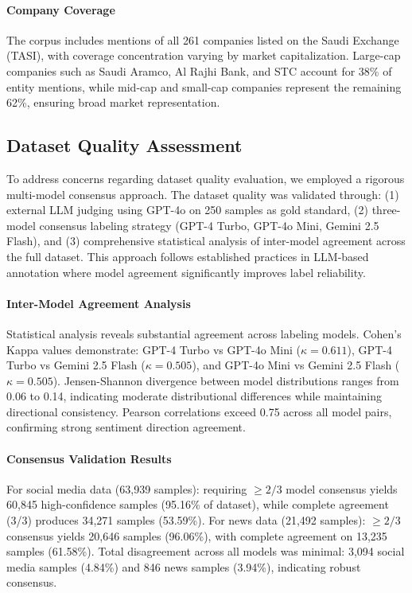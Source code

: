 \documentclass[10pt,a4paper]{article}
\begin{document}
\paragraph{Company Coverage}
The corpus includes mentions of all 261 companies listed on the Saudi Exchange (TASI), with coverage concentration varying by market capitalization. Large-cap companies such as Saudi Aramco, Al Rajhi Bank, and STC account for 38\% of entity mentions, while mid-cap and small-cap companies represent the remaining 62\%, ensuring broad market representation.

\subsection{Dataset Quality Assessment}
\label{sec:dataset_quality}

To address concerns regarding dataset quality evaluation, we employed a rigorous multi-model consensus approach. The dataset quality was validated through: (1) external LLM judging using GPT-4o on 250 samples as gold standard, (2) three-model consensus labeling strategy (GPT-4 Turbo, GPT-4o Mini, Gemini 2.5 Flash), and (3) comprehensive statistical analysis of inter-model agreement across the full dataset. This approach follows established practices in LLM-based annotation where model agreement significantly improves label reliability.

\paragraph{Inter-Model Agreement Analysis}
Statistical analysis reveals substantial agreement across labeling models. Cohen's Kappa values demonstrate: GPT-4 Turbo vs GPT-4o Mini ($\kappa = 0.611$), GPT-4 Turbo vs Gemini 2.5 Flash ($\kappa = 0.505$), and GPT-4o Mini vs Gemini 2.5 Flash ($\kappa = 0.505$). Jensen-Shannon divergence between model distributions ranges from 0.06 to 0.14, indicating moderate distributional differences while maintaining directional consistency. Pearson correlations exceed 0.75 across all model pairs, confirming strong sentiment direction agreement.

\paragraph{Consensus Validation Results}
For social media data (63,939 samples): requiring $\geq 2/3$ model consensus yields 60,845 high-confidence samples (95.16\% of dataset), while complete agreement (3/3) produces 34,271 samples (53.59\%). For news data (21,492 samples): $\geq 2/3$ consensus yields 20,646 samples (96.06\%), with complete agreement on 13,235 samples (61.58\%). Total disagreement across all models was minimal: 3,094 social media samples (4.84\%) and 846 news samples (3.94\%), indicating robust consensus.
\end{document}
